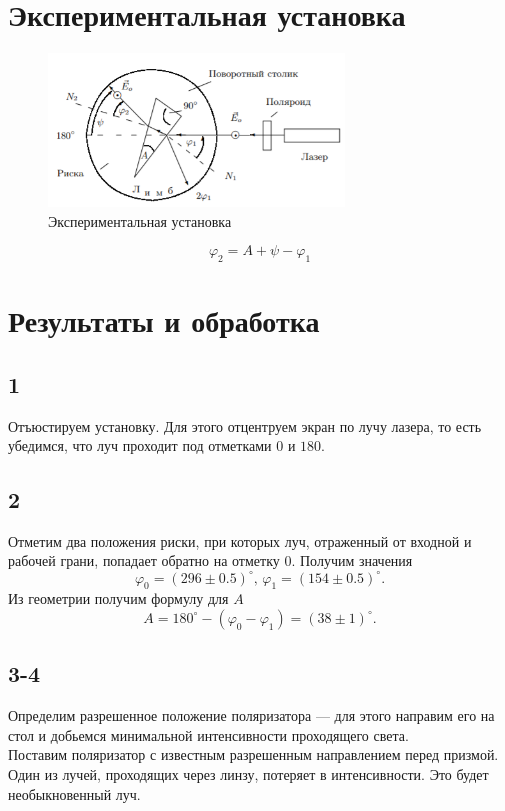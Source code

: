\section*{Экспериментальная установка}

\begin{figure}[h]
\begin{center}
\includegraphics[width = 0.7\textwidth]{2.png}
\caption{Экспериментальная установка}
\end{center}
\end{figure}
\begin{equation}
\varphi_2 = A + \psi - \varphi_1
\end{equation}

\section*{Результаты и обработка}
\subsection*{1}
Отъюстируем установку. Для этого отцентруем экран по лучу лазера, то есть убедимся, что луч проходит под отметками $0$ и $180$.
\subsection*{2}
Отметим два положения риски, при которых луч, отраженный от входной и рабочей грани, попадает обратно на отметку $0$. Получим значения
\[\varphi_0 = (296\pm0.5)^\circ,\,\varphi_1 = (154\pm0.5)^\circ.\]
Из геометрии получим формулу для $A$
\[A=180^\circ-(\varphi_0-\varphi_1) = (38\pm1)^\circ.\]
\subsection*{3-4}
Определим разрешенное положение поляризатора --- для этого направим его на стол и добьемся минимальной интенсивности проходящего света.\\
Поставим поляризатор с известным разрешенным направлением перед призмой. Один из лучей, проходящих через линзу, потеряет в интенсивности. Это будет необыкновенный луч.

